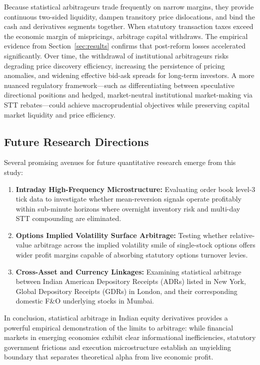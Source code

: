 \documentclass[11pt,a4paper]{article}
\begin{document}
Because statistical arbitrageurs trade frequently on narrow margins, they provide continuous two-sided liquidity, dampen transitory price dislocations, and bind the cash and derivatives segments together. When statutory transaction taxes exceed the economic margin of mispricings, arbitrage capital withdraws. The empirical evidence from Section~\ref{sec:results} confirms that post-reform losses accelerated significantly. Over time, the withdrawal of institutional arbitrageurs risks degrading price discovery efficiency, increasing the persistence of pricing anomalies, and widening effective bid-ask spreads for long-term investors. A more nuanced regulatory framework---such as differentiating between speculative directional positions and hedged, market-neutral institutional market-making via STT rebates---could achieve macroprudential objectives while preserving capital market liquidity and price efficiency.

\subsection{Future Research Directions}
Several promising avenues for future quantitative research emerge from this study:
\begin{enumerate}
    \item \textbf{Intraday High-Frequency Microstructure:} Evaluating order book level-3 tick data to investigate whether mean-reversion signals operate profitably within sub-minute horizons where overnight inventory risk and multi-day STT compounding are eliminated.
    \item \textbf{Options Implied Volatility Surface Arbitrage:} Testing whether relative-value arbitrage across the implied volatility smile of single-stock options offers wider profit margins capable of absorbing statutory options turnover levies.
    \item \textbf{Cross-Asset and Currency Linkages:} Examining statistical arbitrage between Indian American Depository Receipts (ADRs) listed in New York, Global Depository Receipts (GDRs) in London, and their corresponding domestic F\&O underlying stocks in Mumbai.
\end{enumerate}
In conclusion, statistical arbitrage in Indian equity derivatives provides a powerful empirical demonstration of the limits to arbitrage: while financial markets in emerging economies exhibit clear informational inefficiencies, statutory government frictions and execution microstructure establish an unyielding boundary that separates theoretical alpha from live economic profit.
\end{document}
